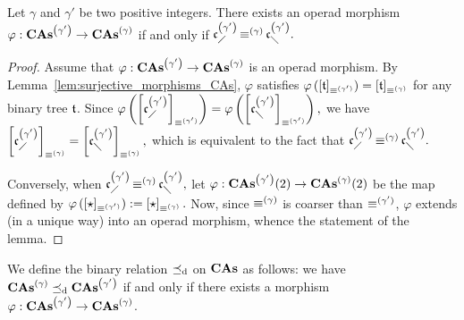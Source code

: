 \begin{Lemma} \label{lem:morphism_CAs}
    Let $\gamma$ and $\gamma'$ be two positive integers. There exists an
    operad morphism $\varphi:\mathbf{CAs}^{\left(\gamma'\right)} \to \mathbf{CAs}^{\left(\gamma\right)}$ if and only
    if
    \begin{math}
      \mathfrak{c}^{\left(\gamma'\right)}_{\diagup} \operatorname{\equiv}^{(\gamma)} \mathfrak{c}^{\left(\gamma'\right)}_{\diagdown}.
    \end{math}
\end{Lemma}
\begin{proof}
    Assume that $\varphi:\mathbf{CAs}^{\left(\gamma'\right)} \to \mathbf{CAs}^{\left(\gamma\right)}$ is an operad
    morphism. By Lemma~\ref{lem:surjective_morphisms_CAs}, $\varphi$
    satisfies
    \begin{math}
        \varphi\left(\left[\mathfrak{t}\right]_{\operatorname{\equiv}^{(\gamma')}}\right)
        = \left[\mathfrak{t}\right]_{\operatorname{\equiv}^{(\gamma)}}
    \end{math}
    for any binary tree $\mathfrak{t}$.
    Since
    \begin{math}
        \varphi\left(
        \left[\mathfrak{c}^{\left(\gamma'\right)}_{\diagup}\right]_{\operatorname{\equiv}^{(\gamma')}}
        \right)
        =
        \varphi\left(
        \left[\mathfrak{c}^{\left(\gamma'\right)}_{\diagdown}\right]_{\operatorname{\equiv}^{(\gamma')}}
        \right),
    \end{math}
    we have
    \begin{math}
        \left[\mathfrak{c}^{\left(\gamma'\right)}_{\diagup}\right]_{\operatorname{\equiv}^{(\gamma)}}
        =
        \left[\mathfrak{c}^{\left(\gamma'\right)}_{\diagdown}\right]_{\operatorname{\equiv}^{(\gamma)}},
    \end{math}
    which is equivalent to the fact that
    \begin{math}
        \mathfrak{c}^{\left(\gamma'\right)}_{\diagup} \operatorname{\equiv}^{(\gamma)} \mathfrak{c}^{\left(\gamma'\right)}_{\diagdown}.
    \end{math}
    \smallbreak

    Conversely, when
    \begin{math}
        \mathfrak{c}^{\left(\gamma'\right)}_{\diagup}\operatorname{\equiv}^{(\gamma)}\mathfrak{c}^{\left(\gamma'\right)}_{\diagdown},
    \end{math}
    let $\varphi:\mathbf{CAs}^{\left(\gamma'\right)}(2) \to \mathbf{CAs}^{\left(\gamma\right)}(2)$ be the map
    defined by
    \begin{math}
        \varphi\left(
        \left[\operatorname{\star}\right]_{\operatorname{\equiv}^{(\gamma')}}\right)
        :=
        \left[\operatorname{\star}\right]_{\operatorname{\equiv}^{(\gamma)}}.
    \end{math}
    Now, since $\operatorname{\equiv}^{(\gamma)}$ is coarser than $\operatorname{\equiv}^{(\gamma')}$,
    $\varphi$ extends (in a unique way) into an operad morphism, whence
    the statement of the lemma.
\end{proof}
\medbreak

We define the binary relation $\preceq_{\mathrm{d}}$ on $\mathbf{CAs}$ as follows: we have
$\mathbf{CAs}^{\left(\gamma\right)} \preceq_{\mathrm{d}} \mathbf{CAs}^{\left(\gamma'\right)}$ if and only if there exists a
morphism $\varphi:\mathbf{CAs}^{\left(\gamma'\right)} \to \mathbf{CAs}^{\left(\gamma\right)}$.
\medbreak

